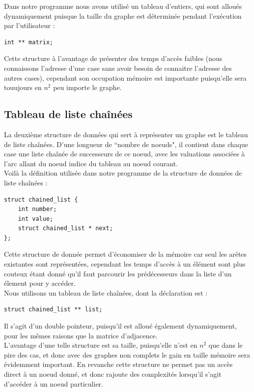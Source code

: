 \documentclass[a4paper,12pt,final] {article}
\begin{document}
Dans notre programme nous avons utilisé un tableau d'entiers, qui sont alloués dynamiquement puisque la taille du graphe est déterminée pendant l'exécution par l'utilisateur :
\begin{lstlisting}
int ** matrix;
\end{lstlisting}

Cette structure à l'avantage de présenter des temps d'accès faibles (nous connaissons l'adresse d'une case sans avoir besoin de connaitre l'adresse des autres cases), cependant son occupation mémoire est importante puisqu'elle sera touujours en $n^{2}$ peu importe le graphe.
\subsection{Tableau de liste chaînées}

La deuxième structure de données qui sert à représenter un graphe est le tableau de liste chaînées. D'une longueur de ``nombre de noeuds", il contient dans chaque case une liste chaînée de successeurs de ce noeud, avec les valuations associées à l'arc allant du noeud indice du tableau au noeud courant.\\

Voilà la définition utilisée dans notre programme de la structure de données de liste chaînées :
\begin{lstlisting}
struct chained_list {
	int number;
	int value;
	struct chained_list * next;
};
\end{lstlisting}

Cette structure de donnée permet d'économiser de la mémoire car seul les arêtes existantes sont représentées, cependant les temps d'accès à un élément sont plus couteux étant donné qu'il faut parcourir les prédécesseurs dans la liste d'un élement pour y accéder.\\

Nous utilisons un tableau de liste chaînées, dont la déclaration est :
\begin{lstlisting}
struct chained_list ** list;
\end{lstlisting}
Il s'agit d'un double pointeur, puisqu'il est alloué également dynamiquement, pour les mêmes raisons que la matrice d'adjacence.\\

L'avantage d'une telle structure est sa taille, puisqu'elle n'est en $n^{2}$ que dans le pire des cas, et donc avec des graphes non complets le gain en taille mémoire sera évidemment important. En revanche cette structure ne permet pas un accès direct à un noeud donné, et donc rajoute des complexités lorsqu'il s'agit d'accéder à un noeud particulier.\\
\end{document}
